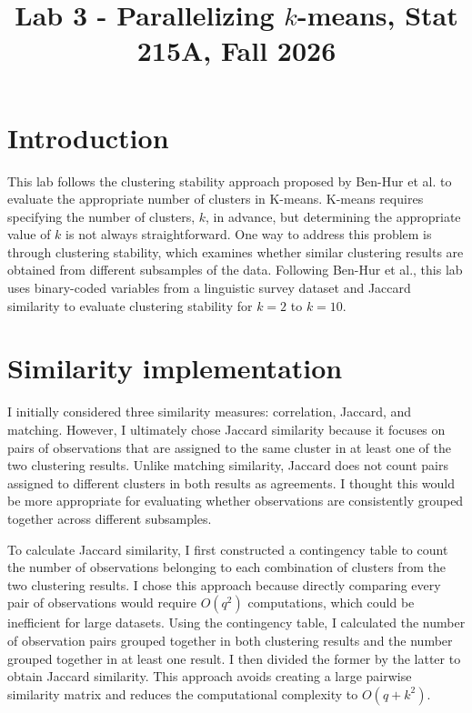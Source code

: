 \documentclass[10pt,letterpaper]{article}
\title{Lab 3 - Parallelizing $k$-means, Stat 215A, Fall 2026\vspace{-2em}}
\begin{document}
\maketitle


\section{Introduction}\label{introduction}

This lab follows the clustering stability approach proposed by Ben-Hur et al. to evaluate the appropriate number of clusters in K-means. K-means requires specifying the number of clusters, $k$, in advance, but determining the appropriate value of $k$ is not always straightforward. One way to address this problem is through clustering stability, which examines whether similar clustering results are obtained from different subsamples of the data. Following Ben-Hur et al., this lab uses binary-coded variables from a linguistic survey dataset and Jaccard similarity to evaluate clustering stability for $k=2$ to $k=10$.

\section{Similarity implementation}

I initially considered three similarity measures: correlation, Jaccard, and matching. However, I ultimately chose Jaccard similarity because it focuses on pairs of observations that are assigned to the same cluster in at least one of the two clustering results. Unlike matching similarity, Jaccard does not count pairs assigned to different clusters in both results as agreements. I thought this would be more appropriate for evaluating whether observations are consistently grouped together across different subsamples.

To calculate Jaccard similarity, I first constructed a contingency table to count the number of observations belonging to each combination of clusters from the two clustering results. I chose this approach because directly comparing every pair of observations would require $O(q^2)$ computations, which could be inefficient for large datasets. Using the contingency table, I calculated the number of observation pairs grouped together in both clustering results and the number grouped together in at least one result. I then divided the former by the latter to obtain Jaccard similarity. This approach avoids creating a large pairwise similarity matrix and reduces the computational complexity to $O(q + k^2)$.
\end{document}
